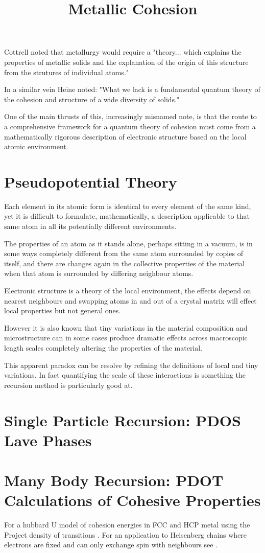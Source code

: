 \title{Metallic Cohesion}
  Cottrell noted that metallurgy would require a "theory... which explains
the properties of metallic solids and the explanation of the origin of this
structure from the strutures of individual atoms." 

In a similar vein Heine noted:
"What we lack is a fundamental quantum theory of the cohesion and structure
of a wide diversity of solids." 

One of the main thrusts of this, increasingly misnamed note, is that the route
to a comprehensive framework for a quantum theory of cohesion must come
from a mathematically rigorous description of electronic structure based
on the local atomic environment. 

\section{Pseudopotential Theory}
  Each element in its atomic form is identical to every element of the same kind,
yet it is difficult to formulate, mathematically, a description applicable 
to that same atom in all its potentially different environments. 

  The properties of an atom as it stands alone, perhaps sitting in a 
vacuum, is in some ways completely different from the same atom 
surrounded by copies of itself, and there are changes again
in the collective properties of the material when that atom is 
surrounded by differing neighbour atoms.

  Electronic structure is a theory of the local environment, the effects depend on nearest
neighbours and swapping atoms in and out of a crystal matrix will 
effect local properties but not general ones. 

However it is also known that tiny variations in the material composition 
and microstructure can in some cases
produce dramatic effects across macroscopic length scales completely 
altering the properties of the material.

This apparent paradox can be resolve by refining the definitions of local
and tiny variations. In fact quantifying the scale of these interactions 
is something the recursion method is particularly good at.

\section{Single Particle Recursion: PDOS Lave Phases}

\section{Many Body Recursion: PDOT Calculations of Cohesive Properties}
  For a hubbard U model of cohesion energies in FCC and HCP metal using the Project density of transitions
\cite{haydock14}. For an application to Heisenberg chains where electrons are fixed and can only exchange
spin with neighbours see \cite{haydock00}.
